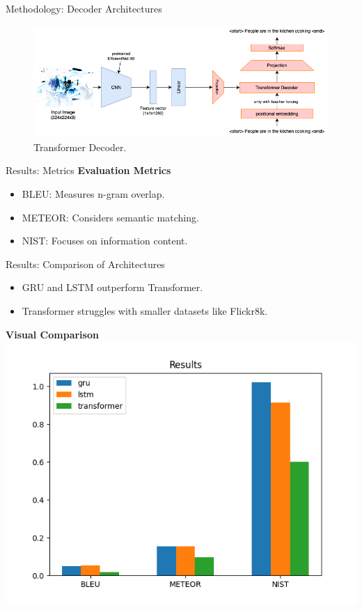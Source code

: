 \documentclass[10pt]{beamer}
\theoremstyle{remark}
\begin{document}
\begin{frame}{Methodology: Decoder Architectures}
	\begin{figure}[H]
		\includegraphics[width=.9\textwidth]{res/transformer.png}
		\caption{Transformer Decoder.}\label{fig:transformer}
	\end{figure}
\end{frame}

\begin{frame}{Results: Metrics}
	\textbf{Evaluation Metrics}
	\begin{itemize}
			\item BLEU: Measures n-gram overlap.
			\item METEOR: Considers semantic matching.
			\item NIST: Focuses on information content.
	\end{itemize}

\end{frame}

\begin{frame}{Results: Comparison of Architectures}
	\begin{itemize}
			\item GRU and LSTM outperform Transformer.
			\item Transformer struggles with smaller datasets like Flickr8k.
	\end{itemize}
	\textbf{Visual Comparison}
	\includegraphics[width=.6\textwidth]{res/metrics.png}
\end{frame}
\end{document}
